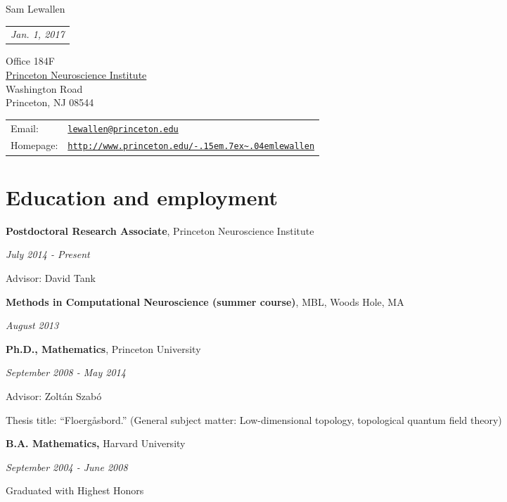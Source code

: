 \documentclass[letterpaper]{article}
\def\name{Sam Lewallen}
\renewenvironment{itemize}{
  \begin{list}{}{
    \setlength{\leftmargin}{1.5em}
  }
}{
  \end{list}
}
\def\urltilda{\kern -.15em\lower .7ex\hbox{\~{}}\kern .04em}
\begin{document}
{\huge \name}
\hfill%
\begin{tabular}[t]{l@{}}
\textit{Jan. 1, 2017}
\end{tabular}
\vspace{0.4in}

\begin{minipage}{0.45\linewidth}
  Office 184F \\
  \href{http://pni.princeton.edu/}{Princeton Neuroscience Institute} \\
  Washington Road \\
  Princeton, NJ 08544
\end{minipage}
\begin{minipage}{0.45\linewidth}
  \begin{tabular}{ll}
    Email: & \href{mailto:lewallen@princeton.edu}{\tt lewallen@princeton.edu} \\
    Homepage: & \href{http://www.princeton.edu/~lewallen}{\tt http://www.princeton.edu/\urltilda lewallen} \\
  \end{tabular}
\end{minipage}

\section*{Education and employment}

\begin{itemize}

\item \textbf{Postdoctoral Research Associate}, Princeton Neuroscience Institute

\textit{July 2014 - Present}

Advisor: David Tank \vspace{0.15in}

\item \textbf{Methods in Computational Neuroscience (summer course)}, MBL, Woods Hole, MA

\textit{August 2013}  \vspace{0.15in}

\item \textbf{Ph.D., Mathematics}, Princeton University

\textit{September 2008 - May 2014}

Advisor: Zolt\'{a}n Szab\'{o}

Thesis title: ``Floerg\aa sbord.'' (General subject matter: Low-dimensional topology, topological quantum field theory)   \vspace{0.15in}

\item \textbf{B.A.  Mathematics,} Harvard University
  
\textit{September 2004 - June 2008}
  
Graduated with Highest Honors
  
\end{itemize}
\end{document}
